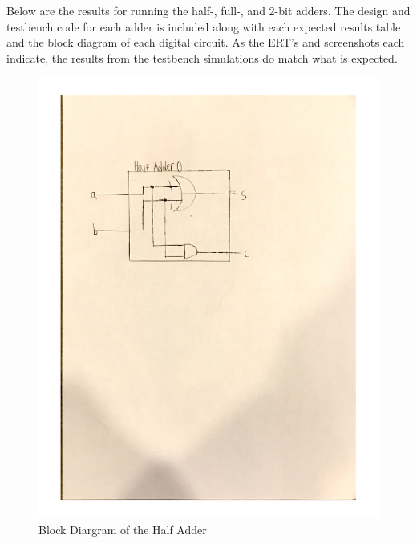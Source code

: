 \documentclass[11pt]{article}
\begin{document}
Below are the results for running the half-, full-, and 2-bit adders. The design and testbench code for each adder is included along with each expected results table and the block diagram of each digital circuit. As the ERT's and screenshots each indicate, the results from the testbench simulations do match what is expected.
\begin{figure}
	\includegraphics[width=1.0\textwidth]{"HalfAdderDia"}
	\caption{Block Diargram of the Half Adder}
\end{figure}
\clearpage
\end{document}
